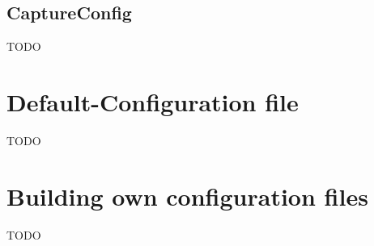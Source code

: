 \subsection{CaptureConfig}
\label{ss:captureConfig}
TODO

\section{Default-Configuration file}
TODO

\section{Building own configuration files}
TODO